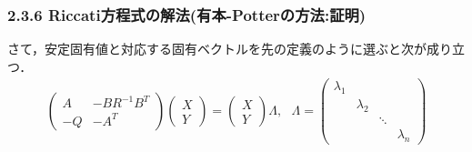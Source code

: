 \begin{frame}[t]
\frametitle{2.3.6 Riccati方程式の解法(有本-Potterの方法:証明)}
さて，安定固有値と対応する固有ベクトルを先の定義のように選ぶと次が成り立つ．
\begin{align}
	\left(\begin{array}{cc}
	       A  & - B R^{-1} B^T \\
	       -Q & - A^T
	\end{array}\right)
		 \left(\begin{array}{c}
		      X \\
		      Y
		\end{array}\right)
	= 
		 \left(\begin{array}{cccc}
		      X \\
		      Y
		\end{array}\right)
		\Lambda
		, \ \ \ 
		\Lambda =
		 \left(\begin{array}{cccc}
		      \lambda_1 & & &  \\
		      & \lambda_2 & &  \\
		      & & \ddots    &  \\
		      & & & \lambda_n 
		\end{array}\right)
\end{align}
\end{frame}

